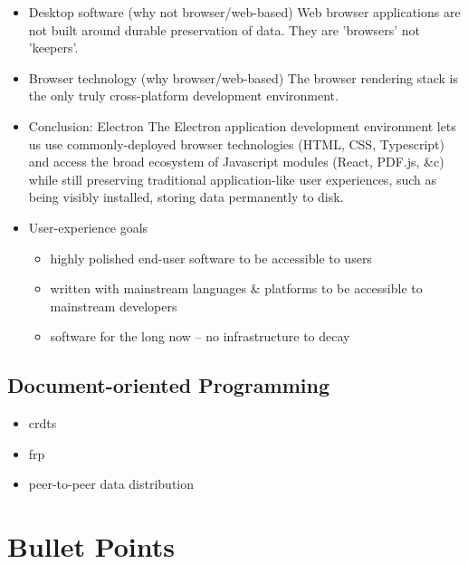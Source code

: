 \documentclass[sigplan,10pt]{acmart}
\begin{document}

\begin{itemize}
    \item Desktop software (why not browser/web-based)
    Web browser applications are not built around durable preservation of data. They are 'browsers' not 'keepers'.
    \item Browser technology (why browser/web-based)
    The browser rendering stack is the only truly cross-platform development environment.
    \item Conclusion: Electron
    The Electron application development environment lets us use commonly-deployed browser technologies (HTML, CSS, Typescript) and access the broad ecosystem of Javascript modules (React, PDF.js, \&c) while still preserving traditional application-like user experiences, such as being visibly installed, storing data permanently to disk.
    \item User-experience goals
    \begin{itemize}
        \item highly polished end-user software to be accessible to users
        \item written with mainstream languages \& platforms to be accessible to mainstream developers
        \item software for the long now -- no infrastructure to decay
    \end{itemize}
\end{itemize}

\subsection{Document-oriented Programming}
\begin{itemize}
    \item crdts
    \item frp
    \item peer-to-peer data distribution
\end{itemize}

\section{Bullet Points}
\end{document}

